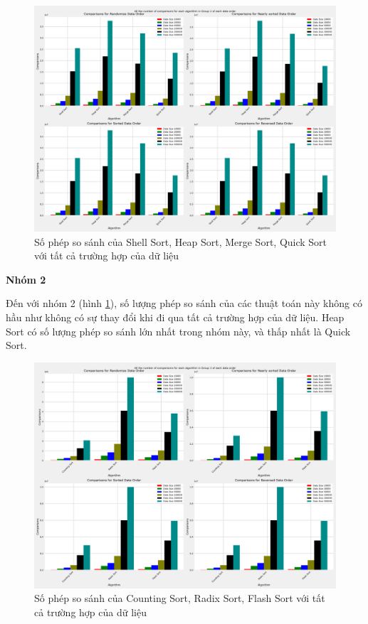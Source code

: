 \begin{figure}[H]
    \centering
    \includegraphics[width=\textwidth]{experimental_result/images/all_the_number_of_comparisons_for_each_algorithm_in_group_2_of_each_data_order.png}
    \caption{Số phép so sánh của Shell Sort, Heap Sort, Merge Sort, Quick Sort với tất cả trường hợp của dữ liệu}
    \label{fig:all_the_number_of_comparisons_for_each_algorithm_in_group_2_of_each_data_order}
\end{figure}

\textbf{Nhóm 2}

Đến với nhóm 2 (hình \ref{fig:all_the_number_of_comparisons_for_each_algorithm_in_group_2_of_each_data_order}), số lượng phép so sánh của các thuật toán này không có hầu như không có sự thay đổi khi đi qua tất cả trường hợp của dữ liệu. Heap Sort có số lượng phép so sánh lớn nhất trong nhóm này, và thấp nhất là Quick Sort. 




\begin{figure}[H]
    \centering
    \includegraphics[width=\textwidth]{experimental_result/images/all_the_number_of_comparisons_for_each_algorithm_in_group_3_of_each_data_order.png}
    \caption{Số phép so sánh của Counting Sort, Radix Sort, Flash Sort với tất cả trường hợp của dữ liệu}
    \label{fig:all_the_number_of_comparisons_for_each_algorithm_in_group_3_of_each_data_order}
\end{figure}

